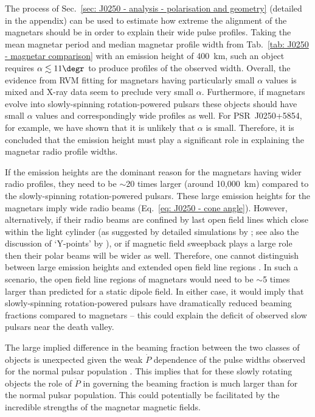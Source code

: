 The process of Sec.~\ref{sec: J0250 - analysis - polarisation and geometry} (detailed in the appendix) can be used to estimate how extreme the alignment of the magnetars should be in order to explain their wide pulse profiles. Taking the mean magnetar period and median magnetar profile width from Tab.~\ref{tab: J0250 - magnetar comparison} with an emission height of 400~km, such an object requires $\alpha\lesssim 11\degr$ to produce profiles of the observed width. Overall, the evidence from RVM fitting for magnetars having particularly small $\alpha$ values is mixed and X-ray data seem to preclude very small $\alpha$. Furthermore, if magnetars evolve into slowly-spinning rotation-powered pulsars these objects should have small $\alpha$ values and correspondingly wide profiles as well. For PSR~J0250+5854, for example, we have shown that it is unlikely that $\alpha$ is small. Therefore, it is concluded that the emission height must play a significant role in explaining the magnetar radio profile widths.

If the emission heights are the dominant reason for the magnetars having wider radio profiles, they need to be $\sim$20 times larger (around 10,000~km) compared to the slowly-spinning rotation-powered pulsars. These large emission heights for the magnetars imply wide radio beams (Eq.~\ref{eq: J0250 - cone angle}). However, alternatively, if their radio beams are confined by last open field lines which close within the light cylinder (as suggested by detailed simulations by \citealt{Sxxx2006}; see also the discussion of `Y-points' by \citealt{Cxxx2014}), or if magnetic field sweepback plays a large role \citep[e.g.][]{CRxx2012} then their polar beams will be wider as well. Therefore, one cannot distinguish between large emission heights and extended open field line regions \citep[e.g.][]{RWJx2015b, RWJx2015a}. In such a scenario, the open field line regions of magnetars would need to be $\sim$5 times larger than predicted for a static dipole field. In either case, it would imply that slowly-spinning rotation-powered pulsars have dramatically reduced beaming fractions compared to magnetars -- this could explain the deficit of observed slow pulsars near the death valley.

The large implied difference in the beaming fraction between the two classes of objects is unexpected given the weak $\dot{P}$ dependence of the pulse widths observed for the normal pulsar population \citep[e.g.][]{KGxx2003, JKxx2019}. This implies that for these slowly rotating objects the role of $\dot{P}$ in governing the beaming fraction is much larger than for the normal pulsar population. This could potentially be facilitated by the incredible strengths of the magnetar magnetic fields.

















